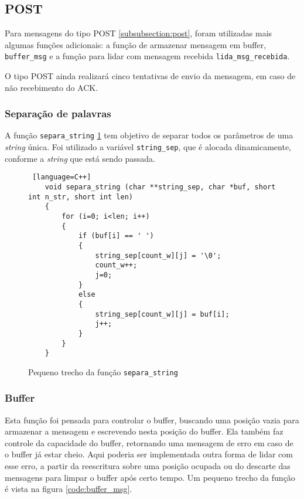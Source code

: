 \subsection{POST}

Para mensagens do tipo POST \ref{subsubsection:post}, foram utilizadas mais algumas funções adicionais: a  função de armazenar mensagem em buffer, \texttt{buffer\_msg} e a função para lidar com mensagem recebida \texttt{lida\_msg\_recebida}.

O tipo POST ainda realizará cinco tentativas de envio da mensagem, em caso de não recebimento do ACK.

\subsubsection{Separação de palavras}
A função \texttt{separa\_string} \ref{code:separa_string} tem objetivo de separar todos os parâmetros de uma \textit{string} única. Foi utilizado a variável \texttt{string\_sep}, que é alocada dinamicamente, conforme a \textit{string} que está sendo passada.

\begin{figure}[!htb]
	\begin{lstlisting} [language=C++]
	void separa_string (char **string_sep, char *buf, short int n_str, short int len)
	{
		for (i=0; i<len; i++)
		{
			if (buf[i] == ' ')
			{			
				string_sep[count_w][j] = '\0';
				count_w++;
				j=0;
			}
			else
			{
				string_sep[count_w][j] = buf[i];
				j++;
			}
		}
	}
	\end{lstlisting}
	\caption{Pequeno trecho da função \texttt{separa\_string}}
	\label{code:separa_string}
\end{figure}


\subsubsection{Buffer}

Esta função foi pensada para controlar o buffer, buscando uma posição vazia para armazenar a mensagem e escrevendo nesta posição do buffer. Ela também faz controle da capacidade do buffer, retornando uma mensagem de erro em caso de o buffer já estar cheio. Aqui poderia ser implementada outra forma de lidar com esse erro, a partir da reescritura sobre uma posição ocupada ou do descarte das mensagens para limpar o buffer após certo tempo. Um pequeno trecho da função é vista na figura \ref{code:buffer_msg}.

